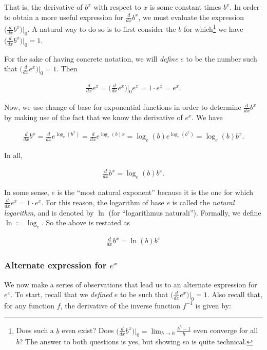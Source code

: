That is, the derivative of $b^x$ with respect to $x$ is some constant times $b^x$. In order to obtain a more useful expression for $\frac{d}{dx} b^x$, we must evaluate the expression $\Big( \frac{d}{dx} b^x \Big)\Big|_0$. A natural way to do so is to first consider the $b$ for which\footnote{Does such a $b$ even exist? Does $\Big( \frac{d}{dx} b^x \Big)\Big|_0 = \lim_{h \rightarrow 0} \frac{b^h - 1}{h}$ even converge for all $b$? The answer to both questions is yes, but showing so is quite technical.} we have $\Big( \frac{d}{dx} b^x \Big)\Big|_0 = 1$.

For the sake of having concrete notation, we will \textit{define} $e$ to be the number such that $\Big( \frac{d}{dx} e^x \Big)\Big|_0 = 1$. Then

\begin{align*}
    \frac{d}{dx} e^x = \Big( \frac{d}{dx} e^x \Big)\Big|_0 e^x = 1 \cdot e^x = e^x.
\end{align*}

Now, we use change of base for exponential functions in order to determine $\frac{d}{dx} b^x$ by making use of the fact that we know the derivative of $e^x$. We have

\begin{align*}
    \frac{d}{dx} b^x = \frac{d}{dx} e^{\log_e(b^x)} = \frac{d}{dx} e^{\log_e(b) x} = \log_e(b) e^{\log_e(b^x)} = \log_e(b) b^x.
\end{align*}

In all,

\begin{align*}
    \frac{d}{dx} b^x = \log_e(b) b^x.
\end{align*}

In some sense, $e$ is the ``most natural exponent'' because it is the one for which $\frac{d}{dx} e^x = 1 \cdot e^x$. For this reason, the logarithm of base $e$ is called the \textit{natural logarithm}, and is denoted by $\ln$ (for ``logarithmus naturali''). Formally, we define $\ln := \log_e$. So the above is restated as

\begin{align*}
    \boxed
    {
        \frac{d}{dx} b^x = \ln(b) b^x
    }
\end{align*}

\subsubsection*{Alternate expression for $e^x$}

We now make a series of observations that lead us to an alternate expression for $e^x$. To start, recall that we \textit{defined} $e$ to be such that $\Big( \frac{d}{dx} e^x \Big)\Big|_0 = 1$. Also recall that, for any function $f$, the derivative of the inverse function $f^{-1}$ is given by:


